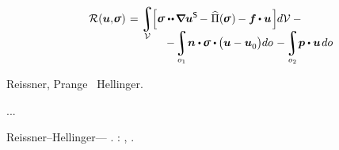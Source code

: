 \nopagebreak\vspace{-0.3em}
\begin{multline}\label{reissnerhellingervariationalprinciple}
\shoveleft{\mathcal{R}( \bm{u}, \hspace{-0.32ex} \linearstress ) \hspace{.2ex} =
\displaystyle\integral\displaylimits_{\mathcal{V}} \hspace{-0.3ex}
\Bigl[
\linearstress \dotdotp \hspace{-0.16ex} \boldnabla {\bm{u}}^{\mathsf{S}} \hspace{-0.2ex} - \hspace{.1ex} \widehat{\potential}(\hspace{-0.1ex}\linearstress\hspace{.1ex})\hspace{-0.1ex} -
\bm{f} \hspace{-0.1ex} \dotp \bm{u}
\hspace{.2ex} \Bigr] \hspace{-0.1ex} d\mathcal{V} \hspace{.5ex}
- \hfill}
\\[-1.2em]
%
\hspace{8em}
- \hspace{-0.2ex} \displaystyle\integral\displaylimits_{o_1} \hspace{-0.4ex} \unitnormalvector \dotp \hspace{-0.1ex} \linearstress \dotp \hspace{-0.1ex} \bigl( \bm{u} - \bm{u}_{\raisemath{-0.1em}{0}} \bigr) do \hspace{.2ex}
- \hspace{-0.2ex} \integral\displaylimits_{o_2} \hspace{-0.4ex} \bm{p} \dotp \bm{u} \hspace{.25ex} do
\end{multline}

\nopagebreak\vspace{-0.2em}\noindent
{}  Reissner, Prange ~Hellinger.

...

 Reissner\hbox{--}Hellinger\:--- .
:  , .


